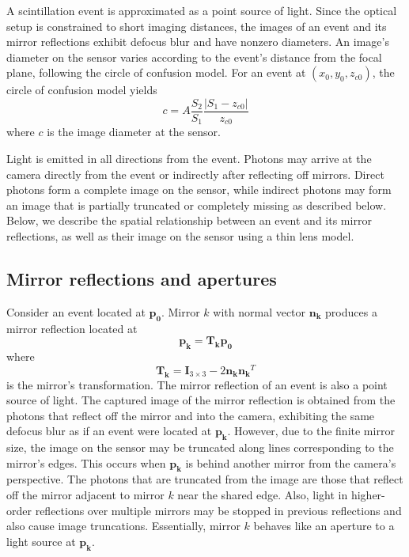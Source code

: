 
A scintillation event is approximated as a point source of light.
Since the optical setup is constrained to short imaging distances, 
the images of an event and its mirror reflections exhibit defocus blur and 
have nonzero diameters.
An image's diameter on the sensor varies according to the event's distance from 
the focal plane, following the circle of confusion model.
For an event at $(x_0,y_0,z_{c0})$, 
the circle of confusion model yields
\begin{equation} \label{eqn:circ_of_conf}
c=A\frac{S_2}{S_1}\frac{|S_1-z_{c0}|}{z_{c0}}
\end{equation}
where $c$ is the image diameter at the sensor.

Light is emitted in all directions from the event.
Photons may arrive at the camera directly from the event or indirectly after 
reflecting off mirrors.
Direct photons form a complete image on the sensor, while indirect photons may 
form an image that is partially truncated or completely missing as described below.
Below, we describe the spatial relationship between an event and its mirror 
reflections, as well as their image on the sensor using a thin lens model.

\subsection{Mirror reflections and apertures}

Consider an event located at $\bm{p_0}$.
Mirror $k$ with normal vector $\bm{n_k}$ produces a mirror reflection located at 
\begin{equation}
\bm{p_k}=\bm{T_k}\bm{p_0}
\end{equation}
where
\begin{equation} \label{eqn:ref_trans}
\bm{T_k}=\bm{I}_{3\times3} - 2\bm{n_k}\bm{n_k}^T
\end{equation}
is the mirror's transformation.
The mirror reflection of an event is also a point source of light.
The captured image of the mirror reflection is obtained from the photons that 
reflect off the mirror and into the camera, exhibiting the same defocus blur as if 
an event were located at $\bm{p_k}$.
However, due to the finite mirror size, the image on the sensor may be truncated 
along lines corresponding to the mirror's edges.
This occurs when $\bm{p_k}$ is behind another mirror from the camera's perspective.
The photons that are truncated from the image are those that reflect off the 
mirror adjacent to mirror $k$ near the shared edge.
Also, light in higher-order reflections over multiple mirrors may be stopped 
in previous reflections and also cause image truncations.
Essentially, mirror $k$ behaves like an aperture to a light source at $\bm{p_k}$. 

